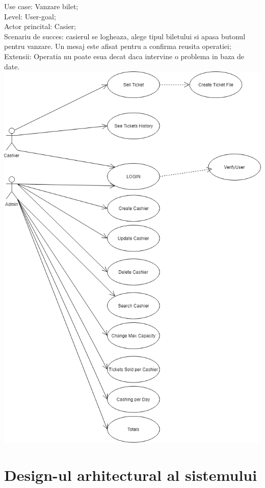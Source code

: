\documentclass[11pt,a4paper,twoside,notitlepage]{article}
\begin{document}
Use case: Vanzare bilet; \\
Level: User-goal; \\
Actor princital: Casier; \\
Scenariu de succes: casierul se logheaza, alege tipul biletului si apasa butonul pentru vanzare. Un mesaj este afisat pentru a confirma reusita operatiei; \\
Extensii: Operatia nu poate esua decat daca intervine o problema in baza de date. \\
\newpage
\includegraphics[height=.5\textheight]{UseCases}


\section{Design-ul arhitectural al sistemului}
\end{document}
